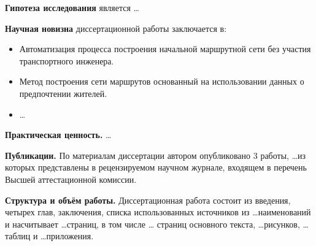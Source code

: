 \textbf{Гипотеза исследования} является \ldots

\textbf{Научная новизна} диссертационной работы заключается в:
\begin{itemize}
    \item Автоматизация процесса построения начальной маршрутной сети без участия транспортного инженера.
    \item Метод построения сети маршрутов основанный на использовании данных о предпочтении жителей.
    \item \ldots
\end{itemize}

\textbf{Практическая ценность.} \ldots

\textbf{Публикации.} По материалам диссертации автором опубликовано 3 работы, \ldots из которых представлены 
в рецензируемом научном журнале, входящем в перечень Высшей аттестационной комиссии. 

\textbf{Структура и объём работы.} Диссертационная работа состоит из введения, четырех глав, заключения, 
списка использованных источников из \ldots наименований и насчитывает \ldots страниц, в том числе \ldots 
страниц основного текста, \ldots рисунков, \ldots таблиц и \ldots приложения.






